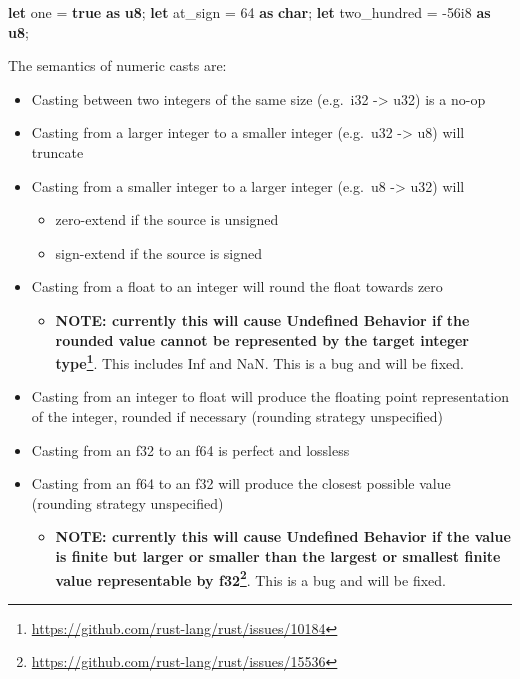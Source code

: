 \documentclass[a4paper,]{book}
\newenvironment{Shaded}{\begin{snugshade}}{\end{snugshade}}
\newcommand{\KeywordTok}[1]{\textcolor[rgb]{0.13,0.29,0.53}{\textbf{{#1}}}}
\newcommand{\DecValTok}[1]{\textcolor[rgb]{0.00,0.00,0.81}{{#1}}}
\newcommand{\NormalTok}[1]{{#1}}
\renewcommand{\href}[2]{#2\footnote{\url{#1}}}
\begin{document}
\begin{Shaded}
\begin{Highlighting}[]
\KeywordTok{let} \NormalTok{one = }\KeywordTok{true} \KeywordTok{as} \KeywordTok{u8}\NormalTok{;}
\KeywordTok{let} \NormalTok{at_sign = }\DecValTok{64} \KeywordTok{as} \KeywordTok{char}\NormalTok{;}
\KeywordTok{let} \NormalTok{two_hundred = -}\DecValTok{56i8} \KeywordTok{as} \KeywordTok{u8}\NormalTok{;}
\end{Highlighting}
\end{Shaded}

The semantics of numeric casts are:

\begin{itemize}
\itemsep1pt\parskip0pt
\item
  Casting between two integers of the same size (e.g.~i32
  -\textgreater{} u32) is a no-op
\item
  Casting from a larger integer to a smaller integer (e.g.~u32
  -\textgreater{} u8) will truncate
\item
  Casting from a smaller integer to a larger integer (e.g.~u8
  -\textgreater{} u32) will

  \begin{itemize}
  \itemsep1pt\parskip0pt
  \item
    zero-extend if the source is unsigned
  \item
    sign-extend if the source is signed
  \end{itemize}
\item
  Casting from a float to an integer will round the float towards zero

  \begin{itemize}
  \itemsep1pt\parskip0pt
  \item
    \textbf{\href{https://github.com/rust-lang/rust/issues/10184}{NOTE:
    currently this will cause Undefined Behavior if the rounded value
    cannot be represented by the target integer type}}. This includes
    Inf and NaN. This is a bug and will be fixed.
  \end{itemize}
\item
  Casting from an integer to float will produce the floating point
  representation of the integer, rounded if necessary (rounding strategy
  unspecified)
\item
  Casting from an f32 to an f64 is perfect and lossless
\item
  Casting from an f64 to an f32 will produce the closest possible value
  (rounding strategy unspecified)

  \begin{itemize}
  \itemsep1pt\parskip0pt
  \item
    \textbf{\href{https://github.com/rust-lang/rust/issues/15536}{NOTE:
    currently this will cause Undefined Behavior if the value is finite
    but larger or smaller than the largest or smallest finite value
    representable by f32}}. This is a bug and will be fixed.
  \end{itemize}
\end{itemize}
\end{document}
